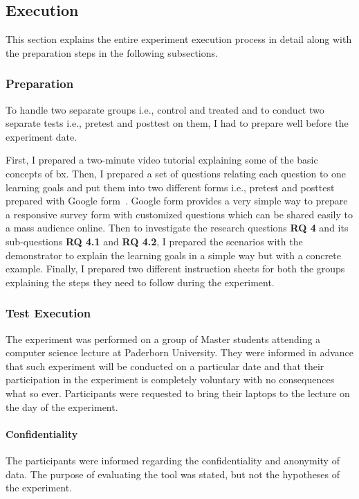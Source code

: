 \subsection{Execution}\label{subsec:execution} 
This section explains the entire experiment execution process in detail along with the preparation steps in the following subsections.

\subsubsection{Preparation }\label{subsubsec:prep}
To handle two separate groups i.e., control and treated and to conduct two separate tests i.e., pretest and posttest on them, I had to prepare well before the experiment date. 

First, I prepared a two-minute video tutorial explaining some of the basic concepts of bx. Then, I prepared a set of questions relating each question to one learning goals and put them into two different forms i.e., pretest and posttest prepared with Google form~\cite{google-forms}. Google form provides a very simple way to prepare a responsive survey form with customized questions which can be shared easily to a mass audience online. Then to investigate the research questions \textbf{RQ 4} and its sub-questions \textbf{RQ 4.1} and \textbf{RQ 4.2}, I prepared the scenarios with the demonstrator to explain the learning goals in a simple way but with a concrete example. Finally, I prepared two different instruction sheets for both the groups explaining the steps they need to follow during the experiment.

\subsubsection{Test Execution}\label{subsubsec:execution}
The experiment was performed on a group of Master students attending a computer science lecture at Paderborn University. They were informed in advance that such experiment will be conducted on a particular date and that their participation in the experiment is completely voluntary with no consequences what so ever. Participants were requested to bring their laptops to the lecture on the day of the experiment.

\paragraph{Confidentiality} The participants were informed regarding the confidentiality and anonymity of data. The purpose of evaluating the tool was stated, but not the hypotheses of the experiment.


